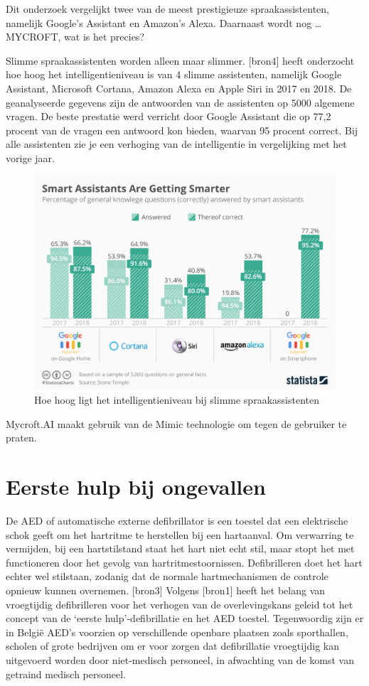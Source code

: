 Dit onderzoek vergelijkt twee van de meest prestigieuze spraakassistenten, namelijk Google’s Assistant en Amazon’s Alexa. Daarnaast wordt nog … MYCROFT, wat is het precies?

Slimme spraakassistenten worden alleen maar slimmer. [bron4] heeft onderzocht hoe hoog het intelligentieniveau is van 4 slimme assistenten, namelijk Google Assistant, Microsoft Cortana, Amazon Alexa en Apple Siri in 2017 en 2018. De geanalyseerde gegevens zijn de antwoorden van de assistenten op 5000 algemene vragen. De beste prestatie werd verricht door Google Assistant die op 77,2 procent van de vragen een antwoord kon bieden, waarvan 95 procent correct. Bij alle assistenten zie je een verhoging van de intelligentie in vergelijking met het vorige jaar.
\begin{figure}[h]
    \centering
    \includegraphics[width=0.7\linewidth]{img/SmartAssistantsAreGettingSmarter}
    \caption{Hoe hoog ligt het intelligentieniveau bij slimme spraakassistenten}
    \label{fig:smartassistantsaregettingsmarter}
\end{figure}

Mycroft.AI maakt gebruik van de Mimic technologie om tegen de gebruiker te praten.

\section{Eerste hulp bij ongevallen}
De AED of automatische externe defibrillator is een toestel dat een elektrische schok geeft om het hartritme te herstellen bij een hartaanval. Om verwarring te vermijden, bij een hartstilstand staat het hart niet echt stil, maar stopt het met functioneren door het gevolg van hartritmestoornissen. Defibrilleren doet het hart echter wel stilstaan, zodanig dat de normale hartmechanismen de controle opnieuw kunnen overnemen. [bron3] Volgens [bron1] heeft het belang van vroegtijdig defibrilleren voor het verhogen van de overlevingskans geleid tot het concept van de ‘eerste hulp’-defibrillatie en het AED toestel. Tegenwoordig zijn er in België AED’s voorzien op verschillende openbare plaatsen zoals sporthallen, scholen of grote bedrijven om er voor zorgen dat defibrillatie vroegtijdig kan uitgevoerd worden door niet-medisch personeel, in afwachting van de komst van getraind medisch personeel.

